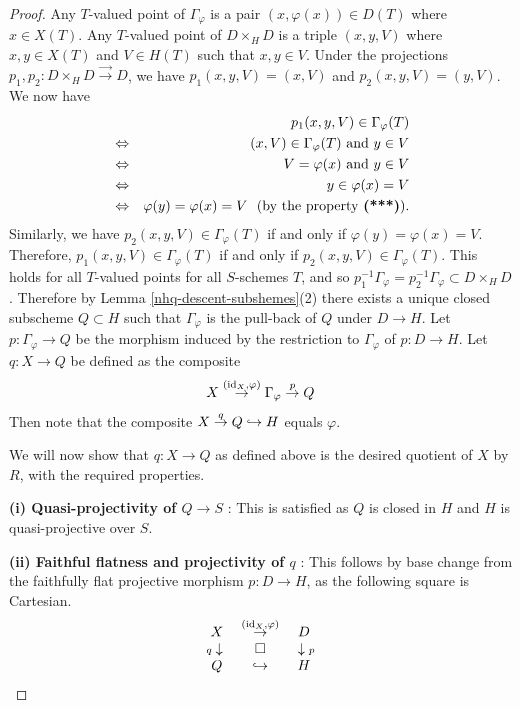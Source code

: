 \begin{proof}
Any $T$-valued point of
$\Gamma_{\varphi}$ is a pair $(x, {\varphi}(x)) \in D(T)$ where
$x\in X(T)$. Any $T$-valued point of $D\times_HD$ is a triple
$(x,y,V)$ where $x,y\in X(T)$ and $V \in H(T)$
such that $x, y \in V$.
Under the projections
$p_1,p_2 :  D\times_HD \stackrel{\to}{\scriptstyle\to} D$,
we have $p_1(x,y,V) = (x,V)$ and $p_2(x,y,V) = (y,V)$.
We now have
\begin{eqnarray*}
&& p_1(x,y,V) \in \Gamma_{\varphi}(T)\\
& \Leftrightarrow & (x,V) \in \Gamma_{\varphi}(T) \mbox{ and }y\in V \\
& \Leftrightarrow & V = \varphi(x)\mbox{ and }y\in V \\
& \Leftrightarrow & y \in \varphi(x) = V \\
& \Leftrightarrow & \varphi(y) = \varphi(x) =V ~~(\mbox{by the property
\textbf{(***)}).}
\end{eqnarray*}
Similarly, we have $p_2(x,y,V) \in \Gamma_{\varphi}(T)$ if and only if
$\varphi(y) = \varphi(x) =V$.
Therefore, $p_1(x,y,V) \in \Gamma_{\varphi}(T)$ if and only if
$p_2(x,y,V) \in \Gamma_{\varphi}(T)$.
This holds for all $T$-valued points for all $S$-schemes $T$, and so
$p_1^{-1}\Gamma_{\varphi} = p_2^{-1}\Gamma_{\varphi} \subset D\times_HD$.
Therefore by Lemma \ref{nhq-descent-subshemes}(2)
there exists a unique closed subscheme $Q \subset H$ such that
$\Gamma_{\varphi}$ is the pull-back of $Q$ under $D\to H$.
Let $p : \Gamma_{\varphi} \to Q$ be the morphism induced by the restriction
to $\Gamma_{\varphi}$ of $p: D\to H$.
Let $q: X\to Q$ be defined as the composite
$$X \stackrel{(\operatorname{id}_X,\varphi)}{\to} \Gamma_{\varphi}
\stackrel{p}{\to} Q$$
Then note that the composite
$X \stackrel{q}{\to} Q \hookrightarrow H$ equals $\varphi$.

We will now show that $q: X\to Q$ as defined above is the desired
quotient of $X$ by $R$, with the required properties.

\textbf{(i) Quasi-projectivity of $Q\to S$ }: This is satisfied as
$Q$ is closed in $H$ and $H$ is quasi-projective over $S$.

\textbf{(ii) Faithful flatness and projectivity of $q$ }:
This follows
by base change from the faithfully flat projective morphism $p: D\to H$,
as the following square is Cartesian.
$$\begin{array}{ccc}
X & \stackrel{(\operatorname{id}_X,\varphi)}{\to} & D \\
{\scriptstyle q} \downarrow ~ & \square & ~ \downarrow {\scriptstyle p} \\
Q & \hookrightarrow & H
\end{array}$$


\end{proof}
